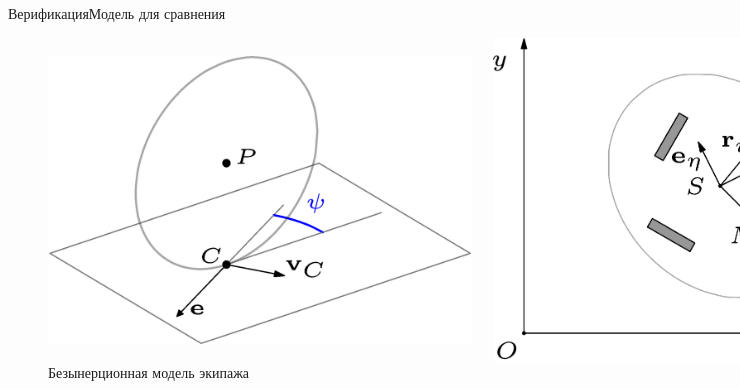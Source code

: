 \begin{frame}{Верификация}{Модель для сравнения}
    \begin{figure}[H]
        \centering
        \begin{columns}
                \centering
                \includegraphics[width=\textwidth]{content/pic/asy/wheel_bor.png}
                \caption{Безынерционная модель колеса}
                \label{fig:bor_wheel_scheme}
                \centering
                \includegraphics[width=\textwidth]{content/pic/asy/cart_bor.png}
                \caption{Безынерционная модель экипажа}
                \label{fig:bor_vehicle}
        \end{columns}
    \end{figure}
\end{frame}

